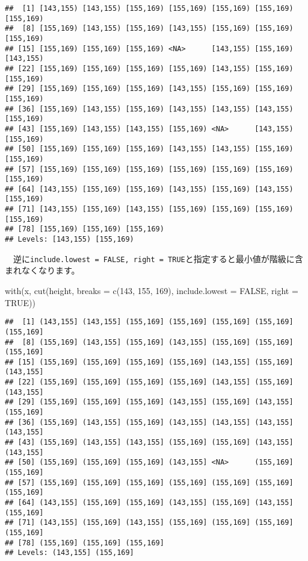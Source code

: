 \documentclass[
  12pt,
]{book}
\newenvironment{Shaded}{\begin{snugshade}}{\end{snugshade}}
\newcommand{\AttributeTok}[1]{\textcolor[rgb]{0.77,0.63,0.00}{#1}}
\newcommand{\ConstantTok}[1]{\textcolor[rgb]{0.00,0.00,0.00}{#1}}
\newcommand{\DecValTok}[1]{\textcolor[rgb]{0.00,0.00,0.81}{#1}}
\newcommand{\FunctionTok}[1]{\textcolor[rgb]{0.00,0.00,0.00}{#1}}
\newcommand{\NormalTok}[1]{#1}
\begin{document}
\begin{verbatim}
##  [1] [143,155) [143,155) [155,169) [155,169) [155,169) [155,169) [155,169)
##  [8] [155,169) [143,155) [155,169) [143,155) [155,169) [155,169) [155,169)
## [15] [155,169) [155,169) [155,169) <NA>      [143,155) [155,169) [143,155)
## [22] [155,169) [155,169) [155,169) [155,169) [143,155) [155,169) [155,169)
## [29] [155,169) [155,169) [155,169) [143,155) [155,169) [155,169) [155,169)
## [36] [155,169) [143,155) [155,169) [143,155) [143,155) [143,155) [155,169)
## [43] [155,169) [143,155) [143,155) [155,169) <NA>      [143,155) [155,169)
## [50] [155,169) [155,169) [155,169) [143,155) [143,155) [155,169) [155,169)
## [57] [155,169) [155,169) [155,169) [155,169) [155,169) [155,169) [155,169)
## [64] [143,155) [155,169) [155,169) [143,155) [155,169) [143,155) [155,169)
## [71] [143,155) [155,169) [143,155) [155,169) [155,169) [155,169) [155,169)
## [78] [155,169) [155,169) [155,169)
## Levels: [143,155) [155,169)
\end{verbatim}

　逆に\texttt{include.lowest\ =\ FALSE,\ right\ =\ TRUE}と指定すると最小値が階級に含まれなくなります。

\begin{Shaded}
\begin{Highlighting}[]
\FunctionTok{with}\NormalTok{(x, }\FunctionTok{cut}\NormalTok{(height, }\AttributeTok{breaks =} \FunctionTok{c}\NormalTok{(}\DecValTok{143}\NormalTok{, }\DecValTok{155}\NormalTok{, }\DecValTok{169}\NormalTok{),}
            \AttributeTok{include.lowest =} \ConstantTok{FALSE}\NormalTok{, }\AttributeTok{right =} \ConstantTok{TRUE}\NormalTok{))}
\end{Highlighting}
\end{Shaded}

\begin{verbatim}
##  [1] (143,155] (143,155] (155,169] (155,169] (155,169] (155,169] (155,169]
##  [8] (155,169] (143,155] (155,169] (143,155] (155,169] (155,169] (155,169]
## [15] (155,169] (155,169] (155,169] (155,169] (143,155] (155,169] (143,155]
## [22] (155,169] (155,169] (155,169] (155,169] (143,155] (155,169] (143,155]
## [29] (155,169] (155,169] (155,169] (143,155] (155,169] (143,155] (155,169]
## [36] (155,169] (143,155] (155,169] (143,155] (143,155] (143,155] (143,155]
## [43] (155,169] (143,155] (143,155] (155,169] (155,169] (143,155] (143,155]
## [50] (155,169] (155,169] (155,169] (143,155] <NA>      (155,169] (155,169]
## [57] (155,169] (155,169] (155,169] (155,169] (155,169] (155,169] (155,169]
## [64] (143,155] (155,169] (155,169] (143,155] (155,169] (143,155] (155,169]
## [71] (143,155] (155,169] (143,155] (155,169] (155,169] (155,169] (155,169]
## [78] (155,169] (155,169] (155,169]
## Levels: (143,155] (155,169]
\end{verbatim}
\end{document}

